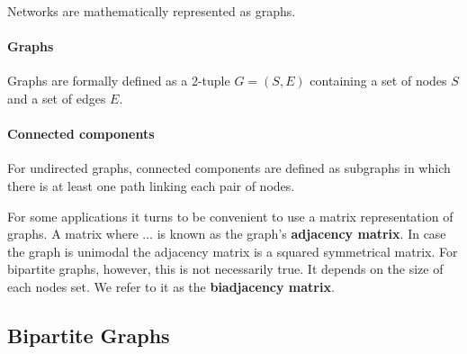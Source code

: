 Networks are mathematically represented as graphs.

\paragraph*{Graphs}
Graphs are formally defined as a 2-tuple $G=(S,E)$ containing a set of nodes $S$ and a set of edges $E$.

\paragraph*{Connected components}
For undirected graphs, connected components are defined as subgraphs in which there is at least one path linking each pair of nodes.



For some applications it turns to be convenient to use a matrix representation of graphs. A matrix where ... is known as the graph's \textbf{adjacency matrix}. %
In case the graph is unimodal the adjacency matrix is a squared symmetrical matrix.
For bipartite graphs, however, this is not necessarily true. It depends on the size of each nodes set. We refer to it as the \textbf{biadjacency matrix}.


\subsection{Bipartite Graphs}


